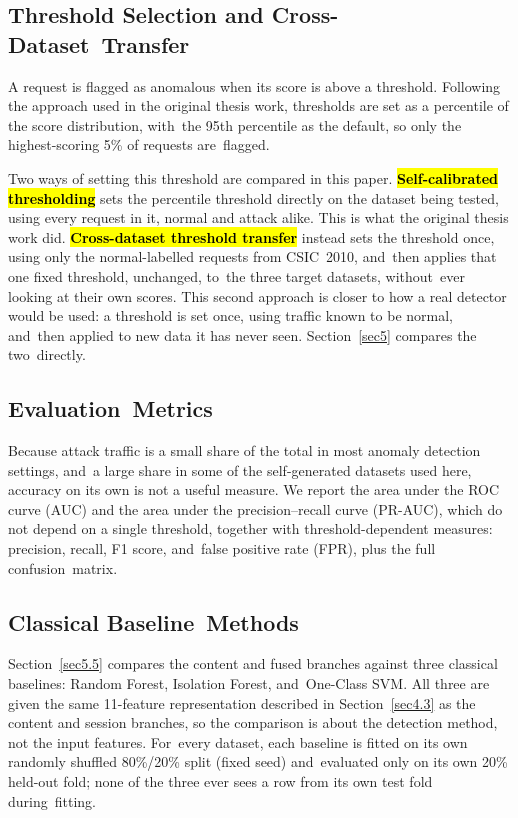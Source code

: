 \documentclass[futureinternet,article,accept,moreauthors]{Definitions/mdpi}
\begin{document}
\subsection{Threshold Selection and Cross-Dataset~Transfer} \label{sec4.7}

A request is flagged as anomalous when its score is above a threshold. Following the approach used in the original thesis work, thresholds are set as a percentile of the score distribution, with~the 95th percentile as the default, so only the highest-scoring 5\% of requests are~flagged.

Two ways of setting this threshold are compared in this paper. \textbf{\hl{Self-calibrated thresholding}%
} sets the percentile threshold directly on the dataset being tested, using every request in it, normal and attack alike. This is what the original thesis work did. \textbf{\hl{Cross-dataset threshold transfer}} instead sets the threshold once, using only the normal-labelled requests from CSIC~2010, and~then applies that one fixed threshold, unchanged, to~the three target datasets, without~ever looking at their own scores. This second approach is closer to how a real detector would be used: a threshold is set once, using traffic known to be normal, and~then applied to new data it has never seen. Section~\ref{sec5} compares the two~directly.

\subsection{Evaluation~Metrics}

Because attack traffic is a small share of the total in most anomaly detection settings, and~a large share in some of the self-generated datasets used here, accuracy on its own is not a useful measure. We report the area under the ROC curve (AUC) and the area under the precision--recall curve (PR-AUC), which do not depend on a single threshold, together with threshold-dependent measures: precision, recall, F1 score, and~false positive rate (FPR), plus the full confusion~matrix.

\subsection{Classical Baseline~Methods} \label{sec4.9}

Section~\ref{sec5.5} compares the content and fused branches against three classical baselines: Random Forest, Isolation Forest, and~One-Class SVM. All three are given the same \mbox{11-feature} representation described in Section~\ref{sec4.3} as the content and session branches, so the comparison is about the detection method, not the input features. For~every dataset, each baseline is fitted on its own randomly shuffled 80\%/20\% split (fixed seed) and~evaluated only on its own 20\% held-out fold; none of the three ever sees a row from its own test fold during~fitting.
\end{document}
